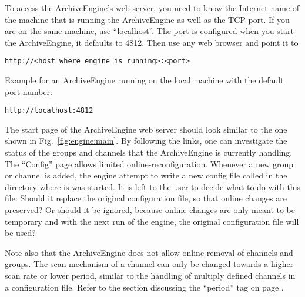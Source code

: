 To access the ArchiveEngine's web server, you need to know the
Internet name of the machine that is running the ArchiveEngine as well
as the TCP port.  If you are on the same machine, use ``localhost''.
The port is configured when you start the ArchiveEngine, it defaults
to 4812. Then use any web browser and point it to

\begin{lstlisting}[frame=none,keywordstyle=\sffamily]
    http://<host where engine is running>:<port>
\end{lstlisting}

\noindent Example for an ArchiveEngine running on the local machine with the
default port number:

\begin{lstlisting}[frame=none,keywordstyle=\sffamily]
    http://localhost:4812
\end{lstlisting}

\noindent The start page of the ArchiveEngine web server should look
similar to the one shown in Fig.~\ref{fig:engine:main}. By following
the links, one can investigate the status of the groups and channels
that the ArchiveEngine is currently handling. The ``Config'' page
allows limited online-reconfiguration. Whenever a new group or channel
is added, the engine attempt to write a new config file called
 in the directory where is was started.
It is left to the user to decide what to do with this file: Should it
replace the original configuration file, so that online changes are
preserved? Or should it be ignored, because online changes are only
meant to be temporary and with the next run of the engine, the
original configuration file will be used?

Note also that the ArchiveEngine does not allow online removal of
channels and groups. The scan mechanism of a channel can only be
changed towards a higher scan rate or lower period, similar to the
handling of multiply defined channels in a configuration file. Refer
to the section discussing the ``period'' tag on page \pageref{sec:period}.

